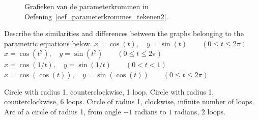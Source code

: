 \begin{Answer}
\begin{figure}[H]
{            
            \hspace{0.7cm}
            }
            \caption{Grafieken van de parameterkrommen in Oefening~\ref{oef_parameterkrommes_tekenen2}.}
            \label{fig_parameterkrommes2}
        \end{figure}
\end{Answer}

\ifanalysis
\begin{Exercise}[difficulty = 2] Describe the similarities and differences between the graphs belonging to the parametric equations below.  %
    \Question $x = \cos(t), \quad y=\sin(t) \qquad \left(0 \leq t \leq 2\pi \right)$
    \Question $x = \cos \left(t^2\right), \quad y=\sin \left(t^2\right) \qquad \left(0 \leq t \leq 2\pi \right)$
    \Question $x = \cos \left(1/t\right), \quad y=\sin \left(1/t\right) \qquad \left(0 < t <1 \right)$
    \Question $x = \cos \left(\cos(t) \right), \quad y=\sin \left(\cos(t) \right) \qquad \left(0 \leq t \leq 2\pi \right)$

\end{Exercise}

\begin{Answer}\phantom{}
     
        \Question Circle with radius 1, counterclockwise, 1 loop.  
        \Question Circle with radius 1, counterclockwise, 6 loops.  
        \Question Circle of radius 1, clockwise,  infinite number of loops. 
        \Question Arc of a circle of radius 1, from angle $-1$ radians to $1$ radians, 2 loops. 
    
\end{Answer}
\fi


